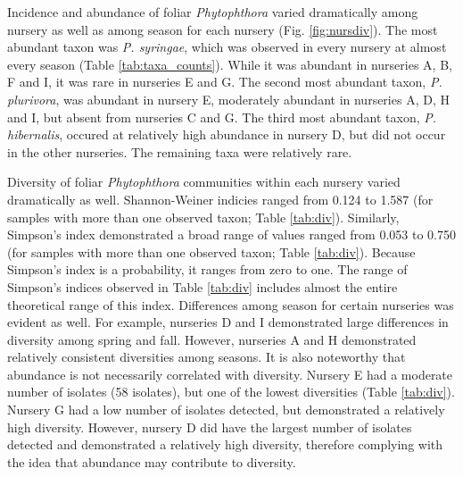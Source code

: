 \documentclass[12pt]{article}
\begin{document}


Incidence and abundance of foliar \emph{Phytophthora} varied dramatically among nursery as well as among season for each nursery (Fig. \ref{fig:nursdiv}).  The most abundant taxon was \emph{P. syringae}, which was observed in every nursery at almost every season (Table \ref{tab:taxa_counts}).  While it was abundant in nurseries A, B, F and I, it was rare in nurseries E and G.  The second most abundant taxon, \emph{P. plurivora}, was abundant in nursery E, moderately abundant in nurseries A, D, H and I, but absent from nurseries C and G.  The third most abundant taxon, \emph{P. hibernalis}, occured at relatively high abundance in nursery D, but did not occur in the other nurseries.  The remaining taxa were relatively rare.

Diversity of foliar \emph{Phytophthora} communities within each nursery varied dramatically as well.  Shannon-Weiner indicies ranged from 0.124 to 1.587 (for samples with more than one observed taxon; Table \ref{tab:div}).  Similarly, Simpson's index demonstrated a broad range of values ranged from 0.053 to 0.750 (for samples with more than one observed taxon; Table \ref{tab:div}).  Because Simpson's index is a probability, it ranges from zero to one.  The range of Simpson's indices observed in Table \ref{tab:div} includes almost the entire theoretical range of this index.  Differences among season for certain nurseries was evident as well.  For example, nurseries D and I demonstrated large differences in diversity among spring and fall.  However, nurseries A and H demonstrated relatively consistent diversities among seasons.  It is also noteworthy that abundance is not necessarily correlated with diversity.  Nursery E had a moderate number of isolates (58 isolates), but one of the lowest diversities (Table \ref{tab:div}).  Nursery G had a low number of isolates detected, but demonstrated a relatively high diversity.  However, nursery D did have the largest number of isolates detected and demonstrated a relatively high diversity, therefore complying with the idea that abundance may contribute to diversity.
\end{document}
